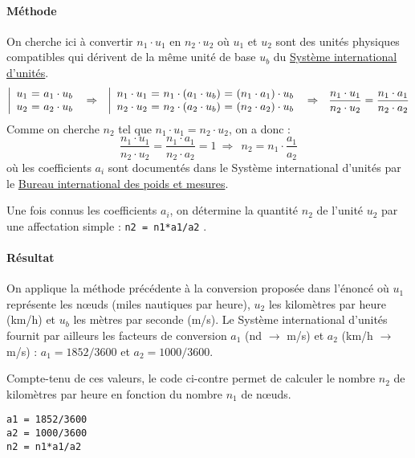 \paragraph{Méthode}
On cherche ici à convertir $n_1\cdot u_1$ en $n_2\cdot u_2$ 
où $u_1$ et $u_2$ sont des unités physiques compatibles 
qui dérivent de la même unité de base $u_b$ du \href{http://www.bipm.org/fr/si/}{Système international d'unités}.
$$\left|\begin{array}{l@{\ =\ }r}
u_1 & a_1\cdot u_b \\
u_2 & a_2\cdot u_b
\end{array}\right.
\ \Rightarrow\ \ 
\left|\begin{array}{l@{\ =\ }r@{\ =\ }r}
n_1\cdot u_1 & n_1\cdot (a_1\cdot u_b) & (n_1\cdot a_1)\cdot u_b\\
n_2\cdot u_2 & n_2\cdot (a_2\cdot u_b) & (n_2\cdot a_2)\cdot u_b
\end{array}\right.
\ \Rightarrow\ \ \frac{n_1\cdot u_1}{n_2\cdot u_2} = \frac{n_1\cdot a_1}{n_2\cdot a_2}$$
Comme on cherche $n_2$ tel que $n_1\cdot u_1 = n_2\cdot u_2$, on a donc :
$$\frac{n_1\cdot u_1}{n_2\cdot u_2} = \frac{n_1\cdot a_1}{n_2\cdot a_2} = 1
\ \Rightarrow\ \ n_2 = n_1 \cdot \frac{a_1}{a_2}$$
où les coefficients $a_i$ sont documentés dans le Système international d'unités par le
\href{http://www.bipm.org/}{Bureau international des poids et mesures}.

Une fois connus les coefficients $a_i$, on détermine la quantité $n_2$ de l'unité $u_2$
par une affectation simple : \texttt{n2 = n1*a1/a2} .

\paragraph{Résultat} On applique la méthode précédente à la conversion
proposée dans l'énoncé où $u_1$ représente les n\oe uds (miles nautiques par heure), 
$u_2$ les kilomètres par heure (km/h) et $u_b$ les mètres par seconde (m/s).
Le Système international d'unités fournit par ailleurs les facteurs 
de conversion $a_1$ (nd $\rightarrow$ m/s) et $a_2$ (km/h $\rightarrow$ m/s) :
$a_1 = 1852/3600$ et $a_2 = 1000/3600$.


\noindent\begin{minipage}[t]{7cm}
Compte-tenu de ces valeurs, le code ci-contre
permet de calculer le nombre $n_2$ de kilomètres par heure
en fonction du nombre $n_1$ de n\oe uds.
\end{minipage}
\hfill
\begin{minipage}[t]{8cm}
\begin{lstlisting}
a1 = 1852/3600
a2 = 1000/3600
n2 = n1*a1/a2
\end{lstlisting}
\end{minipage}

